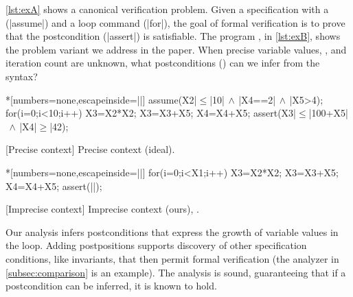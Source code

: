 \autoref{lst:exA} shows a canonical verification problem.
Given a specification with a  (\pr|assume|) and a loop command (\pr|for|), the goal of formal verification is to prove that the postcondition (\pr|assert|) is satisfiable.
The program \emph{\explain}, in \autoref{lst:exB}, shows the problem variant we address in the paper.
When precise variable values, , and iteration count are unknown, what postconditions (\qtext) can we infer from the syntax?

\begin{center}
\begin{minipage}{.45\textwidth}
\captionsetup{type=lstlisting}
\begin{center}
\begin{minipage}{.9\textwidth}
\begin{implisting}*[numbers=none,escapeinside=||]
assume(X2|$\leq$|10|$\,\land\,$|X4==2|$\,\land\,$|X5>4);
for(i=0;i<10;i++) {
  X3=X2*X2;
  X3=X3+X5;
  X4=X4+X5; }
assert(X3|$\leq$|100+X5|$\,\land\,$|X4|$\geq$|42);
\end{implisting}
\end{minipage}
\end{center}
[Precise context]
{Precise context (ideal).}\label{lst:exA}
\end{minipage}\hfill%
\begin{minipage}{.52\textwidth}
\captionsetup{type=lstlisting}
\begin{center}
\begin{minipage}{.85\textwidth}
\begin{implisting}*[numbers=none,escapeinside=||]
for(i=0;i<X1;i++) {
  X3=X2*X2;
  X3=X3+X5;
  X4=X4+X5; }
assert(|\myqm|);
\end{implisting}
\end{minipage}
\end{center}
[Imprecise context]
{Imprecise context (ours), \mbox{\explain}.}\label{lst:exB}
\end{minipage}
\end{center}

Our analysis infers postconditions that express the {growth of variable values} in the loop.
Adding postpositions supports discovery of other specification conditions, like invariants,
that then permit formal verification (the  analyzer in \autoref{subsec:comparison} is an example).
The analysis is sound, guaranteeing that if a postcondition can be inferred, it is known to hold.

